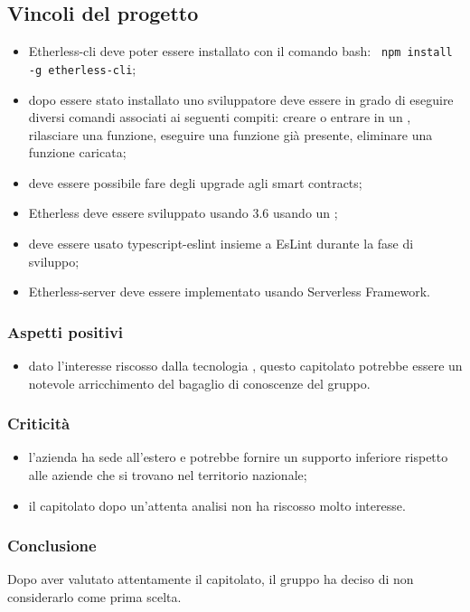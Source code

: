   \subsection{Vincoli del progetto}
    	   \begin{itemize}
    			\item Etherless-cli deve poter essere installato con il comando bash:
    			\verb! npm install -g etherless-cli!;

    			\item dopo essere stato installato uno sviluppatore deve essere in grado di eseguire diversi comandi associati ai seguenti compiti: creare o entrare in un  , rilasciare una funzione, eseguire una funzione già presente, eliminare una funzione caricata;
    			\item deve essere possibile fare degli upgrade agli smart contracts;
    			\item Etherless deve essere sviluppato usando  3.6 usando un ;
    			\item deve essere usato typescript-eslint insieme a EsLint durante la fase di sviluppo;
    			\item Etherless-server deve essere implementato usando Serverless Framework.
	 \end{itemize}


    \subsubsection{Aspetti positivi}
	    \begin{itemize}
    			\item dato l'interesse riscosso dalla tecnologia , questo capitolato potrebbe essere un notevole arricchimento del bagaglio di conoscenze del gruppo.
    	   \end{itemize}
    \subsubsection{Criticità}
    	   \begin{itemize}
    			\item l'azienda ha sede all'estero e potrebbe fornire un supporto inferiore rispetto alle aziende che si trovano nel territorio nazionale;
    			\item il capitolato dopo un'attenta analisi non ha riscosso molto interesse.
    	   \end{itemize}
    \subsubsection{Conclusione}
	Dopo aver valutato attentamente il capitolato, il gruppo ha deciso di non considerarlo come prima scelta.
